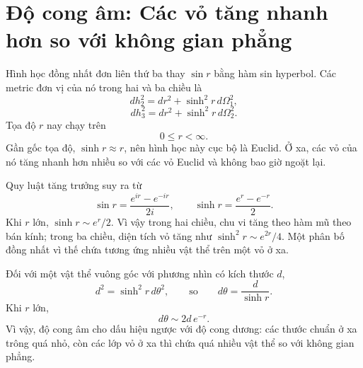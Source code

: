 \section{Độ cong âm: Các vỏ tăng nhanh hơn so với không gian phẳng}

Hình học đồng nhất đơn liên thứ ba thay \(\sin r\) bằng hàm sin hyperbol. Các metric đơn vị của nó trong hai và ba chiều là
\begin{equation}
dh_2^2 = dr^2 + \sinh^2 r\, d\Omega_1^2,
\label{eq:c03-hyperbolic-two}
\end{equation}
\begin{equation}
dh_3^2 = dr^2 + \sinh^2 r\, d\Omega_2^2.
\label{eq:c03-hyperbolic-three}
\end{equation}
Tọa độ \(r\) nay chạy trên
\begin{equation}
0\le r<\infty.
\end{equation}
Gần gốc tọa độ, \(\sinh r\approx r\), nên hình học này cục bộ là Euclid. Ở xa, các vỏ của nó tăng nhanh hơn nhiều so với các vỏ Euclid và không bao giờ ngoặt lại.

Quy luật tăng trưởng suy ra từ
\begin{equation}
\sin r = \frac{e^{ir}-e^{-ir}}{2i},
\qquad
\sinh r = \frac{e^r-e^{-r}}{2}.
\label{eq:c03-sin-sinh}
\end{equation}
Khi \(r\) lớn, \(\sinh r\sim e^r/2\). Vì vậy trong hai chiều, chu vi tăng theo hàm mũ theo bán kính; trong ba chiều, diện tích vỏ tăng như \(\sinh^2r\sim e^{2r}/4\). Một phân bố đồng nhất vì thế chứa tương ứng nhiều vật thể trên một vỏ ở xa.

Đối với một vật thể vuông góc với phương nhìn có kích thước \(d\),
\begin{equation}
d^2 = \sinh^2 r\, d\theta^2,
\qquad\text{so}\qquad
d\theta = \frac{d}{\sinh r}.
\label{eq:c03-hyperbolic-angle}
\end{equation}
Khi \(r\) lớn,
\begin{equation}
d\theta \sim 2d\,e^{-r}.
\end{equation}
Vì vậy, độ cong âm cho dấu hiệu ngược với độ cong dương: các thước chuẩn ở xa trông quá nhỏ, còn các lớp vỏ ở xa thì chứa quá nhiều vật thể so với không gian phẳng.

\begin{classroomqa}
\end{classroomqa}

